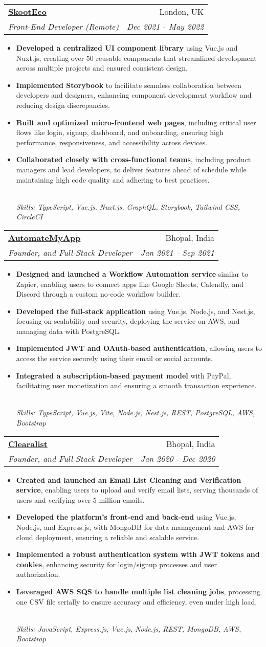 \documentclass[letterpaper,12pt]{article}
\makeatletter
\newcommand{\resumeItem}[1]{
  \item\small{#1}\vspace{-2pt}
}
\newcommand{\resumeSubheading}[4]{
  \vspace{-2pt}\item
    \begin{tabular*}{1\textwidth}[t]{l@{\extracolsep{\fill}}r}
      \textbf{#1} & \small{#2} \\
      \emph{\small{#3}} & \emph{\small{#4}} \\
    \end{tabular*}\vspace{-5pt}
}
\newcommand{\resumeItemFooter}[1]{
    \\ \vspace{7pt}\hspace{-0.35in}\footnotesize\emph{#1}
}
\newcommand{\resumeItemListStart}{\begin{itemize}}
\newcommand{\resumeItemListEnd}{\end{itemize}\vspace{-5pt}}
\def\myHometown{Bhopal, India}
\def\skootLink{https://skoot.eco}
\def\automateMyAppLink{https://automatemyapp.com}
\def\clearalistLink{https://clearalist.com}
\makeatother
\begin{document}
\resumeSubheading
{\href{\skootLink}{\color{blue}SkootEco}}{London, UK}
{Front-End Developer (Remote)}{Dec 2021 - May 2022}
\resumeItemListStart
\resumeItem{\textbf{Developed a centralized UI component library} using Vue.js and Nuxt.js, creating over 50 reusable components that streamlined development across multiple projects and ensured consistent design.}
\resumeItem{\textbf{Implemented Storybook} to facilitate seamless collaboration between developers and designers, enhancing component development workflow and reducing design discrepancies.}
\resumeItem{\textbf{Built and optimized micro-frontend web pages}, including critical user flows like login, signup, dashboard, and onboarding, ensuring high performance, responsiveness, and accessibility across devices.}
\resumeItem{\textbf{Collaborated closely with cross-functional teams}, including product managers and lead developers, to deliver features ahead of schedule while maintaining high code quality and adhering to best practices.}
\resumeItemFooter{Skills: TypeScript, Vue.js, Nuxt.js, GraphQL, Storybook, Tailwind CSS, CircleCI}
\resumeItemListEnd

\resumeSubheading
{\href{\automateMyAppLink}{\color{blue}AutomateMyApp}}{\myHometown}
{Founder, and Full-Stack Developer}{Jan 2021 - Sep 2021}
\resumeItemListStart
\resumeItem{\textbf{Designed and launched a Workflow Automation service} similar to Zapier, enabling users to connect apps like Google Sheets, Calendly, and Discord through a custom no-code workflow builder.}
\resumeItem{\textbf{Developed the full-stack application} using Vue.js, Node.js, and Nest.js, focusing on scalability and security, deploying the service on AWS, and managing data with PostgreSQL.}
\resumeItem{\textbf{Implemented JWT and OAuth-based authentication}, allowing users to access the service securely using their email or social accounts.}
\resumeItem{\textbf{Integrated a subscription-based payment model} with PayPal, facilitating user monetization and ensuring a smooth transaction experience.}
\resumeItemFooter{Skills: TypeScript, Vue.js, Vite, Node.js, Nest.js, REST, PostgreSQL, AWS, Bootstrap}
\resumeItemListEnd

\resumeSubheading
{\href{\clearalistLink}{\color{blue}Clearalist}}{\myHometown}
{Founder, and Full-Stack Developer}{Jan 2020 - Dec 2020}
\resumeItemListStart
\resumeItem{\textbf{Created and launched an Email List Cleaning and Verification service}, enabling users to upload and verify email lists, serving thousands of users and verifying over 5 million emails.}
\resumeItem{\textbf{Developed the platform's front-end and back-end} using Vue.js, Node.js, and Express.js, with MongoDB for data management and AWS for cloud deployment, ensuring a reliable and scalable service.}
\resumeItem{\textbf{Implemented a robust authentication system with JWT tokens and cookies}, enhancing security for login/signup processes and user authorization.}
\resumeItem{\textbf{Leveraged AWS SQS to handle multiple list cleaning jobs}, processing one CSV file serially to ensure accuracy and efficiency, even under high load.}
\resumeItemFooter{Skills: JavaScript, Express.js, Vue.js, Node.js, REST, MongoDB, AWS, Bootstrap}
\resumeItemListEnd
\end{document}
